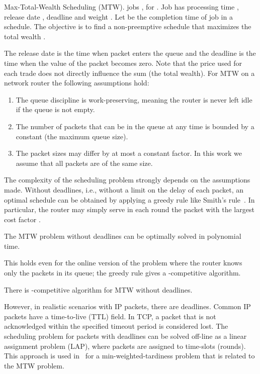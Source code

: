 \documentclass[letterpaper,10pt]{llncs}
\begin{document}
\begin{definition} Max-Total-Wealth Scheduling (MTW).
 jobs , for . Job  has processing time , release date ,
deadline  and weight . Let  be the completion time of job  in a schedule.
The objective is to find a non-preemptive schedule that maximizes the total wealth .
\end{definition}

\noindent
The release date  is the time when packet  enters the queue
and the deadline  is the time when the value of the packet becomes zero.
Note that the price used for each trade does not directly influence the sum  (the total wealth).
For MTW on a network router the following assumptions hold:
\begin{enumerate}
\item The queue discipline is work-preserving, meaning the router is never left idle if the queue is not empty.
\item The number of packets that can be in the queue at any time is bounded by a constant (the maximum queue size). 
\item The packet sizes may differ by at most a constant factor. In this work we assume that all packets are of the same size.
\end{enumerate}

\noindent
The complexity of the scheduling problem strongly depends on the assumptions made. 
Without deadlines, i.e., without a limit on the delay of each packet, 
an optimal schedule can be obtained by applying a greedy rule like Smith's rule~\cite{Smith:1956:Rule}. In particular, the router may simply serve in each 
round the packet with the largest cost factor . 
\begin{theorem}
The MTW problem without deadlines can be optimally solved in polynomial time.
\end{theorem}

\noindent
This holds even for the online version of the problem where the router knows only
the packets in its queue; the greedy rule gives a -competitive algorithm.
\begin{theorem}
There is -competitive algorithm for MTW without deadlines.
\end{theorem}

\noindent
However, in realistic scenarios with IP packets, there are deadlines. Common IP packets 
have a time-to-live (TTL) field. In TCP, a packet that is not acknowledged within the specified
timeout period is considered lost. The scheduling problem for packets with deadlines
can be solved off-line as a linear assignment problem (LAP), where packets are assigned to time-slots 
(rounds).
This approach is used in~\cite{GLLR79} for a min-weighted-tardiness problem 
that is related to the MTW problem.
\end{document}
